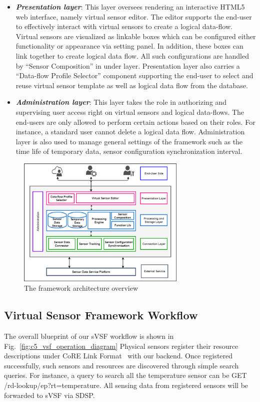 \begin{itemize}
    \item \textbf{\textit{Presentation layer}}: This layer oversees rendering an interactive HTML5 web interface, namely virtual sensor editor. The editor supports the end-user to effectively interact with virtual sensors to create a logical data-flow. Virtual sensors are visualized as linkable boxes which can be configured either functionality or appearance via setting panel. In addition, these boxes can link together to create logical data flow.  All such configurations are handled by “Sensor Composition” in under layer. Presentation layer also carries a “Data-flow Profile Selector” component supporting the end-user to select and reuse virtual sensor template as well as logical data flow from the database.
    \item \textbf{\textit{Administration layer}}: This layer takes the role in authorizing and supervising user access right on virtual sensors and logical data-flows. The end-users are only allowed to perform certain actions based on their roles. For instance, a standard user cannot delete a logical data flow. Administration layer is also used to manage general settings of the framework such as the time life of temporary data, sensor configuration synchronization interval.
\end{itemize}

\begin{figure}[h!] 
 \begin{center} 
 \includegraphics[width=0.72\textwidth]{./Part2/Chapter5/figures/vsf_architecture_overview.png} 
    \caption{The framework architecture overview}
     \label{fig:c5_vsf_architecture_overview}
  \end{center} 
\end{figure}

\subsection{Virtual Sensor Framework Workflow}
The overall blueprint of our sVSF workflow is shown in Fig.~\ref{fig:c5_vsf_operation_diagram} Physical sensors register their resource descriptions under CoRE Link Format~\cite{Shelby2012} with our backend. Once registered successfully, such sensors and resources are discovered through simple search queries. For instance, a query to search all the temperature sensor can be GET /rd-lookup/ep?rt=temperature. All sensing data from registered sensors will be forwarded to sVSF via SDSP. \\

